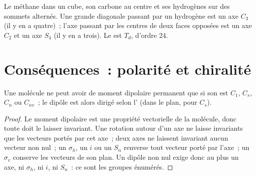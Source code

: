 \begin{omfigure}

{\small Le méthane dans un cube, son carbone au centre et ses hydrogènes
sur des sommets alternés. Une grande diagonale passant par un hydrogène
est un axe $C_3$ (il y en a quatre)~; l'axe passant par les centres de
deux faces opposées est un axe $C_2$ et un axe
$S_4$ (il y en a trois). Le  est $T_d$, d'ordre 24.}
\end{omfigure}

\section{Conséquences~: polarité et chiralité}

\begin{theorem}\label{thm:b3:point-groups:polar}
Une molécule ne peut avoir de moment dipolaire permanent que si son
 est
$C_1$, $C_s$, $C_n$ ou $C_{nv}$~; le dipôle est alors dirigé selon l' (dans le plan, pour $C_s$).
\end{theorem}

\begin{proof}
Le moment dipolaire est une propriété vectorielle de la molécule, donc
toute  doit le laisser invariant. Une rotation
autour d'un axe ne laisse invariants que les vecteurs portés par cet
axe~; deux axes ne laissent invariant aucun vecteur non nul~; un
$\sigma_h$, un $i$ ou un $S_n$ renverse tout vecteur porté par l'axe~; un
$\sigma_v$ conserve les vecteurs de son plan. Un dipôle non nul exige
donc au plus un axe, ni $\sigma_h$, ni $i$, ni $S_n$~: ce sont les
groupes énumérés.
\end{proof}

